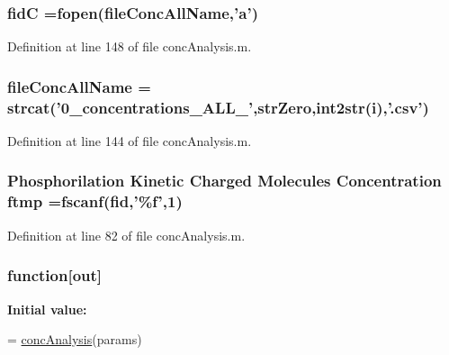 \hypertarget{a00025_a5650dbe23ad9065391c1ea56f8acd34c}{
\subsubsection[{fid\-C}]{\setlength{\rightskip}{0pt plus 5cm}fid\-C =fopen({\bf file\-Conc\-All\-Name},'{\bf a}')}}\label{a00025_a5650dbe23ad9065391c1ea56f8acd34c}


Definition at line 148 of file conc\-Analysis.\-m.

\hypertarget{a00025_a45b397c4e1bd8e68da97ba6d26fbb41f}{
\subsubsection[{file\-Conc\-All\-Name}]{\setlength{\rightskip}{0pt plus 5cm}file\-Conc\-All\-Name = strcat('0\-\_\-concentrations\-\_\-\-A\-L\-L\-\_\-',str\-Zero,int2str(i),'.\-csv')}}\label{a00025_a45b397c4e1bd8e68da97ba6d26fbb41f}


Definition at line 144 of file conc\-Analysis.\-m.

\hypertarget{a00025_ad82fa813707dc406b75a0b6e38d45a3e}{
\subsubsection[{ftmp}]{\setlength{\rightskip}{0pt plus 5cm}Phosphorilation Kinetic Charged Molecules Concentration ftmp ={\bf fscanf}({\bf fid},'\%{\bf f}',1)}}\label{a00025_ad82fa813707dc406b75a0b6e38d45a3e}


Definition at line 82 of file conc\-Analysis.\-m.

\hypertarget{a00025_a370f3dd25136a73d619eba0aa2e3bb4b}{
\subsubsection[{function}]{\setlength{\rightskip}{0pt plus 5cm}function\mbox{[}{\bf out}\mbox{]}}}\label{a00025_a370f3dd25136a73d619eba0aa2e3bb4b}
{\bfseries Initial value\-:}
\begin{DoxyCode}
= \hyperlink{a00036_a18a344cbdf9b3218a438bca78547ab9e}{concAnalysis}(params)
%
%
\end{DoxyCode}


